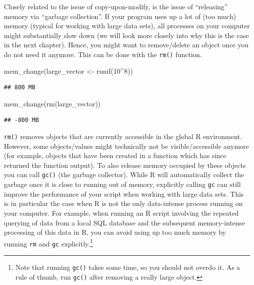 \documentclass[
  12pt,
]{style/krantz}
\newenvironment{Shaded}{\begin{snugshade}}{\end{snugshade}}
\newcommand{\DecValTok}[1]{\textcolor[rgb]{0.00,0.00,0.81}{#1}}
\newcommand{\FunctionTok}[1]{\textcolor[rgb]{0.00,0.00,0.00}{#1}}
\newcommand{\NormalTok}[1]{#1}
\newcommand{\OtherTok}[1]{\textcolor[rgb]{0.56,0.35,0.01}{#1}}
\newcommand{\SpecialCharTok}[1]{\textcolor[rgb]{0.00,0.00,0.00}{#1}}
\begin{document}
Closely related to the issue of copy-upon-modify, is the issue of ``releasing'' memory via ``garbage collection''. If your program uses up a lot of (too much) memory (typical for working with large data sets), all processes on your computer might substantially slow down (we will look more closely into why this is the case in the next chapter). Hence, you might want to remove/delete an object once you do not need it anymore. This can be done with the \texttt{rm()} function.

\begin{Shaded}
\begin{Highlighting}[]
\FunctionTok{mem\_change}\NormalTok{(large\_vector }\OtherTok{\textless{}{-}} \FunctionTok{runif}\NormalTok{(}\DecValTok{10}\SpecialCharTok{\^{}}\DecValTok{8}\NormalTok{))}
\end{Highlighting}
\end{Shaded}

\begin{verbatim}
## 800 MB
\end{verbatim}

\begin{Shaded}
\begin{Highlighting}[]
\FunctionTok{mem\_change}\NormalTok{(}\FunctionTok{rm}\NormalTok{(large\_vector))}
\end{Highlighting}
\end{Shaded}

\begin{verbatim}
## -800 MB
\end{verbatim}

\texttt{rm()} removes objects that are currently accessible in the global R environment. However, some objects/values might technically not be visible/accessible anymore (for example, objects that have been created in a function which has since returned the function output). To also release memory occupied by these objects you can call \texttt{gc()} (the garbage collector). While R will automatically collect the garbage once it is close to running out of memory, explicitly calling \texttt{gc} can still improve the performance of your script when working with large data sets. This is in particular the case when R is not the only data-intense process running on your computer. For example, when running an R script involving the repeated querying of data from a local SQL database and the subsequent memory-intense processing of this data in R, you can avoid using up too much memory by running \texttt{rm} and \texttt{gc} explicitly.\footnote{Note that running \texttt{gc()} takes some time, so you should not overdo it. As a rule of thumb, run \texttt{gc()} after removing a really large object.}
\end{document}
